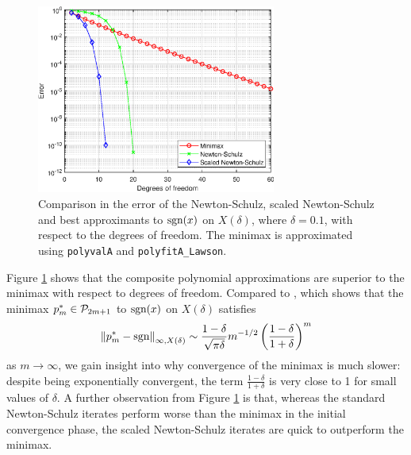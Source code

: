 \begin{figure}[t!]
\centering
   \includegraphics[width=0.7\textwidth,height=0.7\textheight,keepaspectratio]{figures/chapter_3/COMPSIGNvsBEST_DOFpoint1.eps}
   \caption{Comparison in the error of the Newton-Schulz, scaled Newton-Schulz and best approximants to $\text{sgn}(x)$ on $X(\delta)$, where $\delta=0.1$, with respect to the degrees of freedom. The minimax is approximated using \texttt{polyvalA} and \texttt{polyfitA\_Lawson}\protect\footnotemark.}
   \label{fig:compsignvsbestDOF}
\end{figure}

Figure \ref{fig:compsignvsbestDOF} shows that the composite polynomial approximations are superior to the minimax with respect to degrees of freedom. Compared to \cite[Theorem 1]{Erem}, which shows that the minimax $p^*_m \in \mathcal{P}_{2m+1}$ to $\text{sgn}(x)$ on $X(\delta)$ satisfies
\begin{align}
    \left\lVert p^*_m - \text{sgn}\right\rVert_{\infty,X(\delta)} \sim \dfrac{1-\delta}{\sqrt{\pi\delta}} m^{-1/2} \left(\dfrac{1-\delta}{1+\delta}\right)^m \label{eremboi}
\end{align}
as $m\to\infty$, we gain insight into why convergence of the minimax is much slower: despite being exponentially convergent, the term $\frac{1-\delta}{1+\delta}$ is very close to 1 for small values of $\delta$. A further observation from Figure \ref{fig:compsignvsbestDOF} is that, whereas the standard Newton-Schulz iterates perform worse than the minimax in the initial convergence phase, the scaled Newton-Schulz iterates are quick to outperform the minimax.

\bigskip{}


